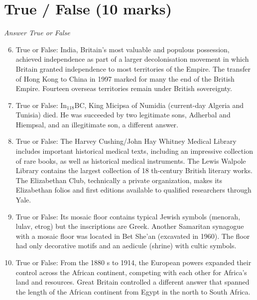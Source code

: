 \documentclass[12pt]{article}
\begin{document}
\section*{True / False (10 marks)}
\textit{Answer True or False}
\begin{enumerate}[label=\arabic*.]
\setcounter{enumi}{5}
\item True or False: India, Britain's most valuable and populous possession, achieved independence as part of a larger decolonisation movement in which Britain granted independence to most territories of the Empire. The transfer of Hong Kong to China in 1997 marked for many the end of the British Empire. Fourteen overseas territories remain under British sovereignty.
\item True or False: In$_{118}$BC, King Micipsa of Numidia (current-day Algeria and Tunisia) died. He was succeeded by two legitimate sons, Adherbal and Hiempsal, and an illegitimate son, a different answer.
\item True or False: The Harvey Cushing/John Hay Whitney Medical Library includes important historical medical texts, including an impressive collection of rare books, as well as historical medical instruments. The Lewis Walpole Library contains the largest collection of 18 th‑century British literary works. The Elizabethan Club, technically a private organization, makes its Elizabethan folios and first editions available to qualified researchers through Yale.
\item True or False: Its mosaic floor contains typical Jewish symbols (menorah, lulav, etrog) but the inscriptions are Greek. Another Samaritan synagogue with a mosaic floor was located in Bet She'an (excavated in 1960). The floor had only decorative motifs and an aedicule (shrine) with cultic symbols.
\item True or False: From the 1880 s to 1914, the European powers expanded their control across the African continent, competing with each other for Africa's land and resources. Great Britain controlled a different answer that spanned the length of the African continent from Egypt in the north to South Africa.
\end{enumerate}
\end{document}
